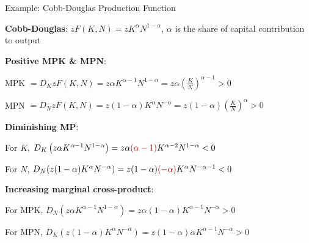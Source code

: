 \documentclass[11pt,aspectratio=169,usenames,dvipsnames]{beamer}
\newcommand{\red}[1]{\textcolor{red}{#1}}
\let\tempone\itemize
\let\temptwo\enditemize
\renewenvironment{itemize}{\tempone\addtolength{\itemsep}{\fill}}{\temptwo}
\begin{document}
\begin{frame}{Example: Cobb-Douglas Production Function}
\label{slide:Example__Cobb_Douglas_Production_Function}
    \begin{itemize}
        \item \textbf{Cobb-Douglas}: $ z F( K, N ) = z K^{\alpha} N^{1-\alpha}$, $ \alpha $ is the share of capital contribution to output
        \item \textbf{Positive MPK \& MPN}:
        \begin{itemize}
            \item MPK $ = D_{K}z F( K, N ) = z \alpha K^{\alpha-1} N^{1-\alpha} = z \alpha \left( \frac{K}{N} \right)^{\alpha-1} > 0$
            \item MPN $ = D_{N}z F( K, N ) = z ( 1-\alpha ) K^{\alpha} N^{-\alpha} = z ( 1-\alpha ) \left( \frac{K}{N} \right)^{\alpha} > 0$
        \end{itemize}
        \item \textbf{Diminishing MP}:
        \begin{itemize}
            \item For $ K $, $ D_{K} \left( z \alpha K^{\alpha-1} N^{1-\alpha} \right) = z \alpha \red{( \alpha - 1 )} K^{\alpha - 2} N^{1-\alpha} < 0$
            \item For $ N $, $ D_{N} ( z ( 1-\alpha ) K^{\alpha} N^{-\alpha} ) = z ( 1-\alpha ) \red{( -\alpha )} K^{\alpha} N^{-\alpha-1} < 0$
        \end{itemize}
        \item \textbf{Increasing marginal cross-product}:
        \begin{itemize}
            \item For MPK, $ D_{N} ( z \alpha K^{\alpha-1} N^{1-\alpha} ) = z \alpha ( 1-\alpha ) K^{\alpha-1}N^{-\alpha} > 0$
            \item For MPN, $ D_{K} ( z ( 1-\alpha ) K^{\alpha} N^{-\alpha}  )  = z ( 1-\alpha ) \alpha K^{\alpha-1} N^{-\alpha} > 0$
        \end{itemize}
    \end{itemize}
\end{frame}
\end{document}
